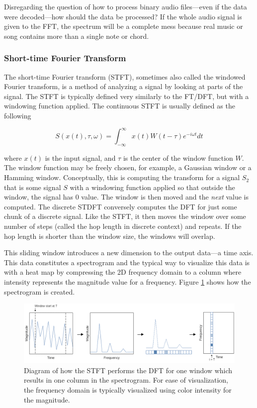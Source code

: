 Disregarding the question of how to process binary audio files—even if the data were decoded—how should the data be processed? If the whole audio signal is given to the FFT, the spectrum will be a complete mess because real music or song contains more than a single note or chord.

\subsubsection{Short-time Fourier Transform}
The short-time Fourier transform (STFT), sometimes also called the windowed Fourier transform, is a method of analyzing a signal by looking at parts of the signal. The STFT is typically defined very similarly to the FT/DFT, but with a windowing function applied. The continuous STFT is usually defined as the following

$$S(x(t), \tau, \omega ) = \int_{-\infty}^{\infty} x(t)W(t-\tau)e^{-i\omega t}dt$$

where $x(t)$ is the input signal, and $\tau$ is the center of the window function $W$. The window function may be freely chosen, for example, a Gaussian window or a Hamming window. Conceptually, this is computing the transform for a signal $S_2$ that is some signal $S$ with a windowing function applied so that outside the window, the signal has 0 value. The window is then moved and the \textit{next} value is computed. The discrete STDFT conversely computes the DFT for just some chunk of a discrete signal. Like the STFT, it then moves the window over some number of steps (called the hop length in discrete context) and repeats. If the hop length is shorter than the window size, the windows will overlap.

This sliding window introduces a new dimension to the output data—a time axis. This data constitutes a spectrogram and the typical way to visualize this data is with a heat map by compressing the 2D frequency domain to a column where intensity represents the magnitude value for a frequency. Figure \ref{fig:stft} shows how the spectrogram is created.

\begin{figure}[ht]
    \centering
    \includegraphics[width=\textwidth]{./images/stft.png}
    \caption{Diagram of how the STFT performs the DFT for one window which results in one column in the spectrogram. For ease of visualization, the frequency domain is typically visualized using color intensity for the magnitude. \label{fig:stft}}
\end{figure}

